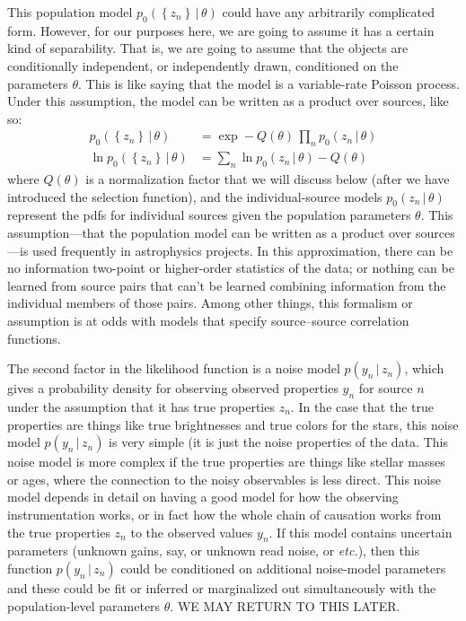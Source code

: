 \documentclass[modern]{aastex62}
\newcommand{\given}{\,|\,}
\newcommand{\set}[1]{\left\{{#1}\right\}}
\newcommand{\foreign}[1]{\textsl{#1}}
\begin{document}
This population model $p_0(\set{z_n}\given\theta)$ could have any arbitrarily
complicated form.
However, for our purposes here, we are going to assume it has a certain kind
of separability.
That is, we are going to assume that the objects are conditionally independent,
or independently drawn, conditioned on the parameters $\theta$.
This is like saying that the model is a variable-rate Poisson process.
Under this assumption, the model can be written as a product over sources, like so:
\begin{align}
    p_0(\set{z_n}\given\theta) &= \exp -Q(\theta)\,\prod_n p_0(z_n\given\theta) \\
\ln p_0(\set{z_n}\given\theta) &= \sum_n \ln p_0(z_n\given\theta) - Q(\theta)
\end{align}
where $Q(\theta)$ is a normalization factor that we will discuss below
(after we have introduced the selection function), and the individual-source
models $p_0(z_n\given\theta)$ represent the pdfs for individual
sources given the population parameters $\theta$.
This assumption---that the population model can be written as a product over
sources---is used frequently in astrophysics projects.
In this approximation, there can be no information two-point or
higher-order statistics of the data; or nothing can be learned from
source pairs that can't be learned combining information from the
individual members of those pairs.
Among other things, this formalism or assumption is at odds with
models that specify source--source correlation functions.

The second factor in the likelihood function is
a noise model $p(y_n\given z_n)$, which gives a probability density for
observing observed properties $y_n$ for source $n$ under the assumption
that it has true properties $z_n$.
In the case that the true properties are things like true brightnesses
and true colors for the stars, this noise model $p(y_n\given z_n)$ is
very simple (it is just the noise properties of the data.
This noise model is more complex if the true properties are things like
stellar masses or ages, where the connection to the noisy observables is
less direct.
This noise model depends in detail on having a good model for how the
observing instrumentation works, or in fact how the whole chain of causation
works from the true properties $z_n$ to the observed values $y_n$.
If this model contains uncertain parameters (unknown gains, say, or
unknown read noise, or \foreign{etc.}), then this function
$p(y_n\given z_n)$ could be conditioned on additional noise-model
parameters and these could be fit or inferred or marginalized out
simultaneously with the population-level parameters $\theta$. WE MAY
RETURN TO THIS LATER.
\end{document}
